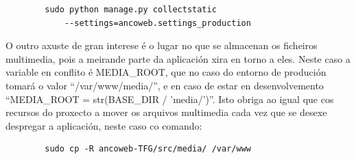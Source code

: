         \begin{verbatim}
        sudo python manage.py collectstatic 
            --settings=ancoweb.settings_production
        \end{verbatim}

        O outro axuste de gran interese é o lugar no que se almacenan os ficheiros multimedia, pois
        a meirande parte da aplicación xira en torno a eles. Neste caso a variable en conflito é 
        MEDIA\_ROOT, que no caso do entorno de produción tomará o valor ``/var/www/media/'', e en 
        caso de estar en desenvolvemento ``MEDIA\_ROOT = str(BASE\_DIR / 'media/')''. Isto obriga ao 
        igual que cos recursos do proxecto a mover os arquivos multimedia cada vez que se desexe 
        despregar a aplicación, neste caso co comando:
        
        \begin{verbatim}
        sudo cp -R ancoweb-TFG/src/media/ /var/www
        \end{verbatim}
